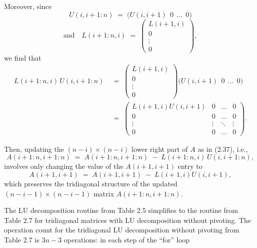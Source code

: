 
Moreover, since
\[
U(i,i+1:n) \;=\; \bigl(U(i,i+1)\ \ 0\ \ \ldots\ \ 0\bigr)
\]
\[
\text{and} \quad L(i+1:n,i) \;=\; \begin{pmatrix} L(i+1,i)\\ 0\\ \vdots\\ 0\end{pmatrix},
\]
we find that
\begin{align*}
L(i+1:n,i)\,U(i,i+1:n)
&\;=\; \begin{pmatrix} L(i+1,i)\\ 0\\ \vdots\\ 0\end{pmatrix}
\bigl(U(i,i+1)\ \ 0\ \ \ldots\ \ 0\bigr)\\[6pt]
&\;=\; \begin{pmatrix}
L(i+1,i)U(i,i+1) & 0 & \ldots & 0\\
0 & 0 & \ldots & 0\\
\vdots & \vdots & \ddots & \vdots\\
0 & 0 & \ldots & 0
\end{pmatrix}.
\end{align*}

Then, updating the $(n-i)\times(n-i)$ lower right part of $A$ as in (2.37), i.e.,
\[
A(i+1:n,i+1:n) \;=\; A(i+1:n,i+1:n) \;-\; L(i+1:n,i)\,U(i,i+1:n),
\]
involves only changing the value of the $A(i+1,i+1)$ entry to
\[
A(i+1,i+1) \;=\; A(i+1,i+1) \;-\; L(i+1,i)U(i,i+1),
\]
which preserves the tridiagonal structure of the updated $(n-i-1)\times(n-i-1)$
matrix $A(i+1:n,i+1:n)$.

The LU decomposition routine from Table 2.5 simplifies to the routine from Table 2.7
for tridiagonal matrices with LU decomposition without pivoting.
The operation count for the tridiagonal LU decomposition without pivoting from
Table 2.7 is $3n-3$ operations: in each step of the ``for'' loop

\begin{center}
\end{center}


